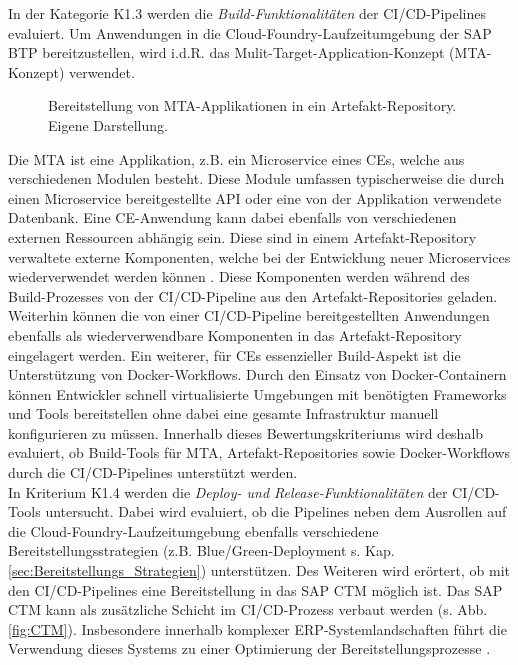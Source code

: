 In der Kategorie K1.3 werden die \textit{Build-Funktionalitäten} der CI/CD-Pipelines evaluiert. 
Um Anwendungen in die Cloud-Foundry-Laufzeitumgebung der SAP BTP bereitzustellen, wird i.d.R. das Mulit-Target-Application-Konzept (MTA-Konzept) verwendet.
\begin{center}
	\begin{figure}[H]
		\centering
		\caption[Bereitstellung von MTA-Applikationen in ein Artefakt-Repository]{Bereitstellung von MTA-Applikationen in ein Artefakt-Repository. Eigene Darstellung.}
		\label{fig:MTA}
	\end{figure}
\end{center}
\vspace*{-15mm}
Die MTA ist eine Applikation, z.B. ein Microservice eines CEs, welche aus verschiedenen Modulen besteht. Diese Module umfassen typischerweise die durch einen Microservice bereitgestellte API oder eine von der Applikation verwendete Datenbank. Eine CE-Anwendung kann dabei ebenfalls von verschiedenen externen Ressourcen abhängig sein. Diese sind in einem Artefakt-Repository verwaltete externe Komponenten, welche bei der Entwicklung neuer Microservices wiederverwendet werden können \cite[Z. 40]{ProductOwnerSAPBTPProd&Infra.}. Diese Komponenten werden während des Build-Prozesses von der CI/CD-Pipeline aus den Artefakt-Repositories geladen. Weiterhin können die von einer CI/CD-Pipeline bereitgestellten Anwendungen ebenfalls als wiederverwendbare Komponenten in das  Artefakt-Repository eingelagert werden. Ein weiterer, für CEs essenzieller Build-Aspekt ist die Unterstützung von Docker-Workflows. Durch den Einsatz von Docker-Containern können Entwickler schnell virtualisierte Umgebungen mit benötigten Frameworks und Tools bereitstellen ohne dabei eine gesamte Infrastruktur manuell konfigurieren zu müssen. Innerhalb dieses Bewertungskriteriums wird deshalb evaluiert, ob Build-Tools für MTA, Artefakt-Repositories sowie Docker-Workflows durch die CI/CD-Pipelines unterstützt werden.\\
In Kriterium K1.4 werden die \textit{Deploy- und Release-Funktionalitäten} der CI/CD-Tools untersucht. Dabei wird evaluiert, ob die Pipelines neben dem Ausrollen auf die Cloud-Foundry-Laufzeitumgebung ebenfalls verschiedene Bereitstellungsstrategien (z.B. Blue/Green-Deployment s. Kap. \ref{sec:Bereitstellungs_Strategien}) unterstützen. Des Weiteren wird erörtert, ob mit den CI/CD-Pipelines eine Bereitstellung in das \ac{SAP CTM} möglich ist.
Das SAP CTM kann als zusätzliche Schicht im CI/CD-Prozess verbaut werden (s. Abb. \ref{fig:CTM}). Insbesondere innerhalb komplexer ERP-Systemlandschaften führt die Verwendung dieses Systems zu einer Optimierung der Bereitstellungsprozesse \cite[Z. 59]{ProductManagerSAPHyperspaceCICD.}. 
